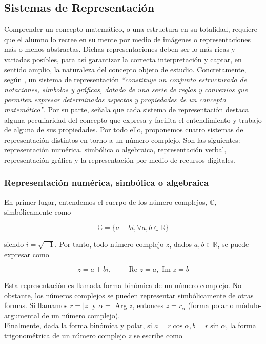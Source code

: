 \documentclass[../main.tex]{memoir}
\begin{document}
\subsection{Sistemas de Representación}

Comprender un concepto matemático, o una estructura en su totalidad, requiere que el alumno lo recree en su mente por medio de imágenes o representaciones más o menos abstractas. Dichas representaciones deben ser lo más ricas y variadas posibles, para así garantizar la correcta interpretación y captar, en sentido amplio, la naturaleza del concepto objeto de estudio. Concretamente, según \cite{rico2016}, un sistema de representación \textit{``constituye un conjunto estructurado de notaciones, símbolos y gráficas, dotado de una serie de reglas y convenios que permiten expresar determinados aspectos y propiedades de un concepto matemático''}. Por su parte, \cite{lupi2013} señala que cada sistema de representación destaca alguna peculiaridad del concepto que expresa y facilita el entendimiento y trabajo de alguna de sus propiedades. Por todo ello, proponemos cuatro sistemas de representación distintos en torno a un número complejo. Son las siguientes: representación numérica, simbólica o algebraica, representación verbal, representación gráfica y la representación por medio de recursos digitales. 

\subsubsection{Representación numérica, simbólica o algebraica}

En primer lugar, entendemos el cuerpo de los número complejos, $\mathbb{C}$, simbólicamente como 

$$\mathbb{C} = \{a+bi, \forall a,b \in \mathbb{R}\}$$

siendo $i = \sqrt{-1}$. Por tanto, todo número complejo $z$, dados $a,b \in \mathbb{R}$, se puede expresar como

$$z = a+bi, \hspace{1cm} \text{Re }z = a, \text{ Im }z = b$$

Esta representación es llamada forma binómica de un número complejo. No obstante, los números complejos se pueden representar simbólicamente de otras formas. Si llamamos $r = |z|$ y $\alpha = $ Arg $z$, entonces $z = r_{\alpha}$ (forma polar o módulo-argumental de un número complejo). \\

Finalmente, dada la forma binómica y polar, si $a = r \cos \alpha, b=r \sin \alpha$, la forma trigonométrica de un número complejo $z$ se escribe como
\end{document}

